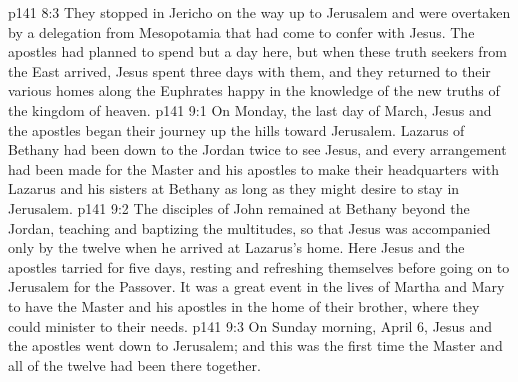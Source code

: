 \vs p141 8:3 They stopped in Jericho on the way up to Jerusalem and were overtaken by a delegation from Mesopotamia that had come to confer with Jesus. The apostles had planned to spend but a day here, but when these truth seekers from the East arrived, Jesus spent three days with them, and they returned to their various homes along the Euphrates happy in the knowledge of the new truths of the kingdom of heaven.
\vs p141 9:1 On Monday, the last day of March, Jesus and the apostles began their journey up the hills toward Jerusalem. Lazarus of Bethany had been down to the Jordan twice to see Jesus, and every arrangement had been made for the Master and his apostles to make their headquarters with Lazarus and his sisters at Bethany as long as they might desire to stay in Jerusalem.
\vs p141 9:2 The disciples of John remained at Bethany beyond the Jordan, teaching and baptizing the multitudes, so that Jesus was accompanied only by the twelve when he arrived at Lazarus’s home. Here Jesus and the apostles tarried for five days, resting and refreshing themselves before going on to Jerusalem for the Passover. It was a great event in the lives of Martha and Mary to have the Master and his apostles in the home of their brother, where they could minister to their needs.
\vs p141 9:3 On Sunday morning, April 6, Jesus and the apostles went down to Jerusalem; and this was the first time the Master and all of the twelve had been there together.
\quizlink
